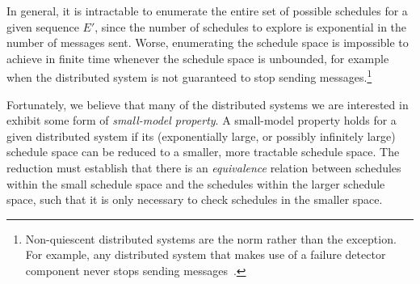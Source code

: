 



In general, it is intractable to enumerate the entire set of possible schedules
for a given sequence $E'$, since the number of schedules to explore is exponential
in the number of messages sent. Worse, enumerating the schedule space is
impossible to achieve in finite time whenever the schedule space is unbounded,
for example when the distributed system is not guaranteed to stop sending
messages.\footnote{Non-quiescent distributed systems are the norm rather than
the exception. For example, any distributed system that makes use of a failure
detector component never stops sending messages~\cite{aguilera1997heartbeat}.}



Fortunately, we \num{believe} that many of the distributed systems we are interested in exhibit some
form of {\em small-model property}. A small-model property holds for a given
distributed system if its (exponentially large, or possibly infinitely large) schedule space can be reduced
to a smaller, more tractable schedule space. The reduction must establish that
there is an {\em equivalence} relation between schedules within the small
schedule space and the schedules within the larger schedule space, such that
it is only necessary to check schedules in the smaller space.

